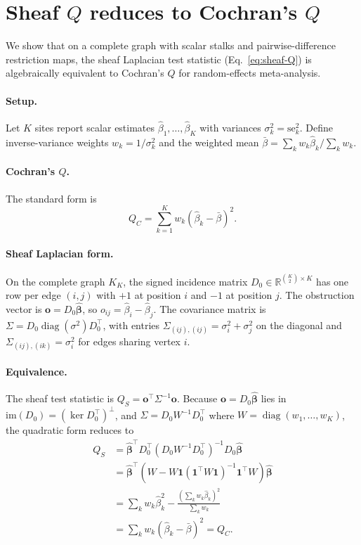 \documentclass{article}
\newcommand{\R}{\mathbb{R}}
\begin{document}
\section{Sheaf $Q$ reduces to Cochran's $Q$}
\label{app:sheaf-cochran}

We show that on a complete graph with scalar stalks and pairwise-difference restriction maps, the sheaf Laplacian test statistic (Eq.~\ref{eq:sheaf-Q}) is algebraically equivalent to Cochran's $Q$ for random-effects meta-analysis.

\paragraph{Setup.}
Let $K$ sites report scalar estimates $\hat\beta_1, \ldots, \hat\beta_K$ with variances $\sigma_k^2 = \mathrm{se}_k^2$. Define inverse-variance weights $w_k = 1/\sigma_k^2$ and the weighted mean $\bar\beta = \sum_k w_k \hat\beta_k / \sum_k w_k$.

\paragraph{Cochran's $Q$.}
The standard form is
\begin{equation}\label{eq:cochran}
    Q_C = \sum_{k=1}^{K} w_k (\hat\beta_k - \bar\beta)^2.
\end{equation}

\paragraph{Sheaf Laplacian form.}
On the complete graph $K_K$, the signed incidence matrix $D_0 \in \R^{\binom{K}{2} \times K}$ has one row per edge $(i,j)$ with $+1$ at position $i$ and $-1$ at position $j$. The obstruction vector is $\mathbf{o} = D_0 \hat{\boldsymbol{\beta}}$, so $o_{ij} = \hat\beta_i - \hat\beta_j$. The covariance matrix is $\Sigma = D_0 \operatorname{diag}(\sigma^2) D_0^\top$, with entries $\Sigma_{(ij),(ij)} = \sigma_i^2 + \sigma_j^2$ on the diagonal and $\Sigma_{(ij),(ik)} = \sigma_i^2$ for edges sharing vertex $i$.

\paragraph{Equivalence.}
The sheaf test statistic is $Q_S = \mathbf{o}^\top \Sigma^{-1} \mathbf{o}$. Because $\mathbf{o} = D_0 \hat{\boldsymbol{\beta}}$ lies in $\mathrm{im}(D_0) = (\ker D_0^\top)^\perp$, and $\Sigma = D_0 W^{-1} D_0^\top$ where $W = \operatorname{diag}(w_1, \ldots, w_K)$, the quadratic form reduces to
\begin{align}
    Q_S &= \hat{\boldsymbol{\beta}}^\top D_0^\top (D_0 W^{-1} D_0^\top)^{-1} D_0 \hat{\boldsymbol{\beta}} \nonumber \\
        &= \hat{\boldsymbol{\beta}}^\top (W - W \mathbf{1}({\mathbf{1}}^\top W \mathbf{1})^{-1} {\mathbf{1}}^\top W) \hat{\boldsymbol{\beta}} \label{eq:pseudoinverse} \\
        &= \sum_k w_k \hat\beta_k^2 - \frac{(\sum_k w_k \hat\beta_k)^2}{\sum_k w_k} \nonumber \\
        &= \sum_k w_k (\hat\beta_k - \bar\beta)^2 = Q_C. \nonumber
\end{align}
\end{document}
